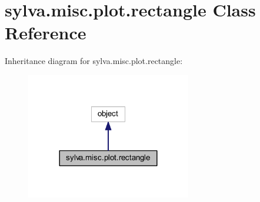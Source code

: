 \hypertarget{classsylva_1_1misc_1_1plot_1_1rectangle}{}\section{sylva.\+misc.\+plot.\+rectangle Class Reference}
\label{classsylva_1_1misc_1_1plot_1_1rectangle}


Inheritance diagram for sylva.\+misc.\+plot.\+rectangle\+:\nopagebreak
\begin{figure}[H]
\begin{center}
\leavevmode
\includegraphics[width=204pt]{classsylva_1_1misc_1_1plot_1_1rectangle__inherit__graph}
\end{center}
\end{figure}

